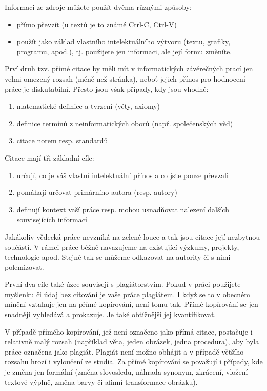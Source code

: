 \documentclass[male,czech,api_bc]{kitheses}
\begin{document}
Informaci ze zdroje můžete použít dvěma různými způsoby:

\begin{itemize}
\item přímo převzít (u textů je to známé Ctrl-C, Ctrl-V)
\item použít jako základ vlastního intelektuálního výtvoru (textu, grafiky, programu, apod.), tj. použijete jen informaci, ale její formu změníte.
\end{itemize}

Prví druh tzv. přímé citace by měli mít v informatických závěrečných prací jen velmi omezený rozsah (méně než stránka), neboť jejich přínos pro hodnocení práce je diskutabilní. Přesto jsou však případy, kdy jsou vhodné:

\begin{enumerate}
\item matematické definice a tvrzení (věty, axiomy)
\item definice termínů z neinformatických oborů (např. společenských věd)
\item citace norem resp. standardů
\end{enumerate} 

Citace mají tři základní cíle:
\begin{enumerate}
\item určují, co je váš vlastní intelektuální přínos a co jste pouze převzali
\item pomáhají určovat primárního autora (resp. autory)
\item definují kontext vaší práce resp. mohou usnadňovat nalezení dalších souvisejících informací
\end{enumerate}

Jakákoliv vědecká práce nevzniká na zelené louce a tak jsou citace její nezbytnou součástí. V rámci práce běžně navazujeme na existující výzkumy, projekty, technologie apod. Stejně tak se můžeme odkazovat na autority či s nimi polemizovat.

První dva cíle také úzce souvisejí s plagiátorstvím. Pokud v práci použijete myšlenku či údaj bez citování je vaše práce plagiátem. I když se to v obecném mínění vztahuje jen na přímé kopírování, není tomu tak. Přímé kopírování se jen snadněji vyhledává a prokazuje. Je také obtížnější jej kvantifikovat.

V případě přímého kopírování, jež není označeno jako přímá citace, postačuje i relativně malý rozsah (například věta, jeden obrázek, jedna procedura), aby byla práce označena jako plagiát. Plagiát není možno obhájit a v případě většího rozsahu hrozí i vyloučení ze studia. Za přímé kopírování se považují i případy, kde je změna jen formální (změna slovosledu, náhrada synonym, zkrácení, vložení textové výplně, změna barvy či afinní transformace obrázku).
\end{document}
